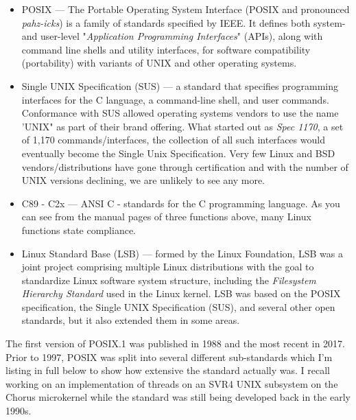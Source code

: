 \begin{itemize}
	\item POSIX --- The Portable Operating System Interface (POSIX and pronounced \textit{pahz-icks}) 
		is a family of standards specified by IEEE. It defines both system- and user-level "\textit{Application 
		Programming Interfaces}" (APIs), along with command line shells and utility interfaces, for software 
		compatibility (portability) with variants of UNIX and other operating systems. 
	\item Single UNIX Specification (SUS) --- a standard that specifies programming interfaces for the C language, 
		a command-line shell, and user commands. Conformance with SUS allowed operating systems vendors
		to use the name 'UNIX" as part of their brand offering. What started out as \textit{Spec 1170}, a
		set of 1,170 commands/interfaces, the collection of all such interfaces would eventually become the Single Unix Specification.
		Very few Linux and BSD vendors/distributions have gone through certification and with the number of UNIX versions declining, 
		we are unlikely to see any more.
	\item C89 - C2x --- ANSI C - standards for the C programming language. As you can see from the manual pages
		of three functions above, many Linux functions state compliance. 
	\item Linux Standard Base (LSB) --- formed by the Linux Foundation, LSB was a joint project 
		comprising multiple Linux distributions with the goal to standardize Linux software system structure, 
		including the \textit{Filesystem Hierarchy Standard} used in the Linux kernel. LSB was based 
		on the POSIX specification, the Single UNIX Specification (SUS), and several other open standards, 
		but it also extended them in some areas.
\end{itemize}

\noindent
The first version of POSIX.1 was published in 1988 and the most recent in 2017. Prior to 1997, POSIX was split into several different sub-standards which I'm listing in full below to show how extensive the standard actually was. I recall working on an implementation of threads on an SVR4 UNIX subsystem on the Chorus microkernel while the standard was still being developed back in the early 1990s.

